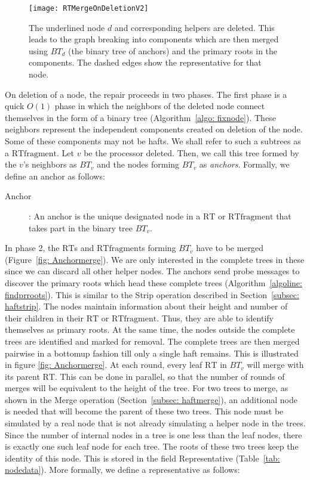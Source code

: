 \documentclass[11pt, letter]{article}
\newcommand{\RT}{\mathrm{RT}}
\newcommand{\RTfragment}{\mathrm{RTfragment}}
\begin{document}
\begin{figure}[h!]
\centering
\texttt{[image: RTMergeOnDeletionV2]}
\caption{The underlined node $d$ and corresponding helpers are deleted. This leads to the graph breaking into
components which are then merged using $BT_{d}$ (the binary tree of anchors) and the primary roots in the components. The dashed edges
show the representative for that node.}
\label{fig: RTmerge}
\end{figure}




On deletion of a node, the repair proceeds in two phases. The first phase is a quick $O(1)$ phase in which the neighbors
of the deleted node connect themselves in the form of a binary tree (Algorithm~\ref{algo: fixnode}). These neighbors represent the
independent components created on deletion of the node. Some of these components may not be hafts. We shall refer to
such a subtrees as a $\RTfragment$. Let $v$ be the processor deleted. Then, we call this tree formed by the $v$'s
neighbors as $BT_{v}$ and the nodes forming $BT_{v}$ as \emph{anchors}. Formally, we define an anchor as follows:
\begin{description}
\item[Anchor]: An anchor is the unique designated node in a $\RT$ or $\RTfragment$ that takes part in the binary
tree $BT_{v}$.
\end{description}
 In phase 2,  the $\RT$s and $\RTfragment$s forming $BT_{v}$ have to be merged (Figure~\ref{fig: Anchormerge}). We are only interested in
the complete trees in these since we can discard all other helper nodes. The anchors send probe messages to discover
the primary roots which head these complete trees (Algorithm~\ref{algoline: findprroots}). This is similar to the Strip
operation described in Section~{\ref{subsec: haftstrip}}. The
nodes maintain information about their height and number of their children in their $\RT$ or $\RTfragment$. Thus,
they are able to identify themselves as primary roots. At the same time, the nodes outside the complete trees are
identified and marked for removal. The complete trees are then merged pairwise in a bottomup fashion till only a single
haft remains. This is
illustrated in figure \ref{fig: Anchormerge}. At each round, every leaf $\RT$ in $BT_{v}$ will merge with its parent
$\RT$. This can be done in parallel, so that the  number of rounds of merges will be equivalent to the height of the
tree. For two trees to merge, as shown in the Merge operation (Section~\ref{subsec: haftmerge}), an additional node is
needed that will become the parent of these two trees. This node must be simulated by a real node that is not already
simulating a helper node in the trees. Since the number of internal  nodes in a tree is one less than the leaf nodes,
there is exactly one such leaf node for each tree. The roots of these two trees keep the identity of this node. This is
stored in the field Representative (Table~\ref{tab: nodedata}). More  formally, we define a representative as follows:
\end{document}
